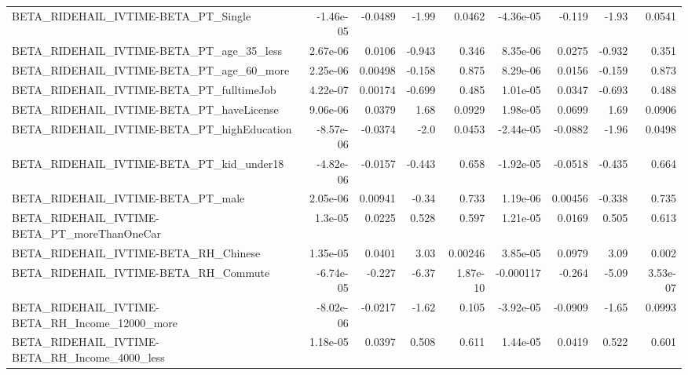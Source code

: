 \begin{tabular}{lrrrrrrrr}
BETA\_RIDEHAIL\_IVTIME-BETA\_PT\_Single                &   -1.46e-05 &      -0.0489 &    -1.99 &   0.0462 &  -4.36e-05 &      -0.119 &        -1.93 &        0.0541 \\
BETA\_RIDEHAIL\_IVTIME-BETA\_PT\_age\_35\_less           &    2.67e-06 &       0.0106 &   -0.943 &    0.346 &   8.35e-06 &      0.0275 &       -0.932 &         0.351 \\
BETA\_RIDEHAIL\_IVTIME-BETA\_PT\_age\_60\_more           &    2.25e-06 &      0.00498 &   -0.158 &    0.875 &   8.29e-06 &      0.0156 &       -0.159 &         0.873 \\
BETA\_RIDEHAIL\_IVTIME-BETA\_PT\_fulltimeJob           &    4.22e-07 &      0.00174 &   -0.699 &    0.485 &   1.01e-05 &      0.0347 &       -0.693 &         0.488 \\
BETA\_RIDEHAIL\_IVTIME-BETA\_PT\_haveLicense           &    9.06e-06 &       0.0379 &     1.68 &   0.0929 &   1.98e-05 &      0.0699 &         1.69 &        0.0906 \\
BETA\_RIDEHAIL\_IVTIME-BETA\_PT\_highEducation         &   -8.57e-06 &      -0.0374 &     -2.0 &   0.0453 &  -2.44e-05 &     -0.0882 &        -1.96 &        0.0498 \\
BETA\_RIDEHAIL\_IVTIME-BETA\_PT\_kid\_under18           &   -4.82e-06 &      -0.0157 &   -0.443 &    0.658 &  -1.92e-05 &     -0.0518 &       -0.435 &         0.664 \\
BETA\_RIDEHAIL\_IVTIME-BETA\_PT\_male                  &    2.05e-06 &      0.00941 &    -0.34 &    0.733 &   1.19e-06 &     0.00456 &       -0.338 &         0.735 \\
BETA\_RIDEHAIL\_IVTIME-BETA\_PT\_moreThanOneCar        &     1.3e-05 &       0.0225 &    0.528 &    0.597 &   1.21e-05 &      0.0169 &        0.505 &         0.613 \\
BETA\_RIDEHAIL\_IVTIME-BETA\_RH\_Chinese               &    1.35e-05 &       0.0401 &     3.03 &  0.00246 &   3.85e-05 &      0.0979 &         3.09 &         0.002 \\
BETA\_RIDEHAIL\_IVTIME-BETA\_RH\_Commute               &   -6.74e-05 &       -0.227 &    -6.37 & 1.87e-10 &  -0.000117 &      -0.264 &        -5.09 &      3.53e-07 \\
BETA\_RIDEHAIL\_IVTIME-BETA\_RH\_Income\_12000\_more     &   -8.02e-06 &      -0.0217 &    -1.62 &    0.105 &  -3.92e-05 &     -0.0909 &        -1.65 &        0.0993 \\
BETA\_RIDEHAIL\_IVTIME-BETA\_RH\_Income\_4000\_less      &    1.18e-05 &       0.0397 &    0.508 &    0.611 &   1.44e-05 &      0.0419 &        0.522 &         0.601 \\

\end{tabular}
